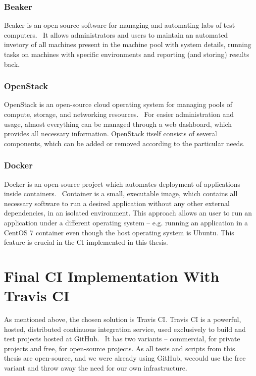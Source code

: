 \subsubsection{Beaker} \label{ref:beaker}
    Beaker is an open-source software for managing and automating labs of test
    computers.~\cite{beaker-docs} It allows administrators and users to maintain an
    automated invetory of all machines present in the machine pool with
    system details, running tasks on machines with specific environments and
    reporting (and storing) results back.

\subsubsection{OpenStack} \label{ref:openstack}
    OpenStack is an open-source cloud operating system for managing pools of compute, storage,
    and networking resources.~\cite{openstack-docs} For easier administration and
    usage, almost everything can be managed through a web dashboard, which provides
    all necessary information. OpenStack itself consists of several components,
    which can be added or removed according to the particular needs.

\subsubsection{Docker} \label{ref:docker}
    Docker is an open-source project which automates deployment of applications
    inside containers.~\cite{docker-docs} Container is a small, executable image,
    which contains all necessary software to run a desired application without
    any other external dependencies, in an isolated environment. This approach
    allows an user to run an application under a different operating system -- e.g.
    running an application in a CentOS 7 container even though the host operating
    system is Ubuntu. This feature is crucial in the CI implemented in this thesis.

\section{Final CI Implementation With Travis CI}
    As mentioned above, the chosen solution is Travis CI. Travis CI is a powerful,
    hosted, distributed continuous integration service, used exclusively to
    build and test projects hosted at GitHub.~\cite{travis-ci-docs} It has two
    variants -- commercial, for private projects and free, for open-source
    projects. As all tests and scripts from this thesis are open-source, and
    we were already using GitHub, wecould use the free variant and throw away
    the need for our own infrastructure.

